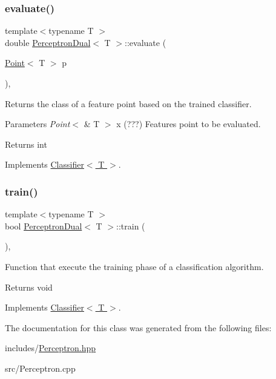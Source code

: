 \subsubsection{\texorpdfstring{evaluate()}{evaluate()}}
{\footnotesize\ttfamily template$<$typename T $>$ \\
double \hyperlink{class_perceptron_dual}{Perceptron\+Dual}$<$ T $>$\+::evaluate (\begin{DoxyParamCaption}\item[{\hyperlink{class_point}{Point}$<$ T $>$}]{p }\end{DoxyParamCaption})\hspace{0.3cm}{\ttfamily [override]}, {\ttfamily [virtual]}}



Returns the class of a feature point based on the trained classifier. 


\begin{DoxyParams}{Parameters}
{\em Point$<$} & T $>$ x (???) Features point to be evaluated. \\
\hline
\end{DoxyParams}
\begin{DoxyReturn}{Returns}
int 
\end{DoxyReturn}


Implements \hyperlink{class_classifier_ab3b9544a8d9c3cbde8d5865c7e9be0fb}{Classifier$<$ T $>$}.

\mbox{\label{class_perceptron_dual_ac5e6aac8184fdf8f9d39d8d183d49190}} 
\subsubsection{\texorpdfstring{train()}{train()}}
{\footnotesize\ttfamily template$<$typename T $>$ \\
bool \hyperlink{class_perceptron_dual}{Perceptron\+Dual}$<$ T $>$\+::train (\begin{DoxyParamCaption}{ }\end{DoxyParamCaption})\hspace{0.3cm}{\ttfamily [override]}, {\ttfamily [virtual]}}



Function that execute the training phase of a classification algorithm. 

\begin{DoxyReturn}{Returns}
void 
\end{DoxyReturn}


Implements \hyperlink{class_classifier_a120849bfdfa3ba7a0388b32b2d76bf4f}{Classifier$<$ T $>$}.



The documentation for this class was generated from the following files\+:\begin{DoxyCompactItemize}
\item 
includes/\hyperlink{_perceptron_8hpp}{Perceptron.\+hpp}\item 
src/Perceptron.\+cpp\end{DoxyCompactItemize}
